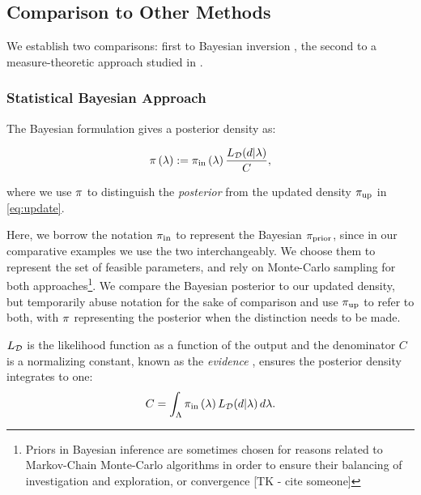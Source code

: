 
\subsection{Comparison to Other Methods}\label{sec:othermethods}
We establish two comparisons: first to Bayesian inversion \cite{Walpole, Berger, Complete, Smith}, the second to a measure-theoretic approach studied in \cite{BET+14, BE13}.


\subsubsection{Statistical Bayesian Approach}


The Bayesian formulation gives a posterior density as:

\begin{equation}\label{eq:sb_post}
    \pi\left ( \lambda \right ) := \operatorname*{\pi_{in}}\left ( \lambda \right ) \frac{L_{\mathcal{D}} (d | \lambda)}{ C },
\end{equation}

where we use $\pi$ to distinguish the \emph{posterior} from the updated density $\operatorname*{\pi_{up}}$ in \eqref{eq:update}.

Here, we borrow the notation $\operatorname*{\pi_{in}}$ to represent the Bayesian $\pi_\text{prior}$, since in our comparative examples we use the two interchangeably.
We choose them to represent the set of feasible parameters, and rely on Monte-Carlo sampling for both approaches\footnote{Priors in Bayesian inference are sometimes chosen for reasons related to Markov-Chain Monte-Carlo algorithms in order to ensure their balancing of investigation and exploration, or convergence [TK - cite someone]}.
We compare the Bayesian posterior to our updated density, but temporarily abuse notation for the sake of comparison and use $\operatorname*{\pi_{up}}$ to refer to both, with $\pi$ representing the posterior when the distinction needs to be made. 

$L_{\mathcal{D}}$ is the likelihood function as a function of the output and the denominator $C$ is a normalizing constant, known as the \emph{evidence} \cite{Smith}, ensures the posterior density integrates to one:
\[
C = \int_{\Lambda} \operatorname*{\pi_{in}}\left ( \lambda \right ) L_{\mathcal{D}}(d | \lambda) \, d\lambda.
\]

